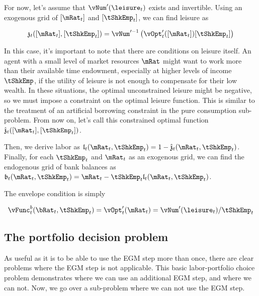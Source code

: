 \documentclass[\econtexRoot/EGMN]{subfiles}
\begin{document}
For now, let's assume that $\vNum'(\leisure_{t})$ exists and invertible. Using
an exogenous grid of $[\mRat_{t}]$ and $[\tShkEmp_{t}]$, we can find leisure as

\providecommand{\zEndFunc}{\ensuremath{\mathfrak{z}}}

\begin{equation}
    \zEndFunc_{t}([\mRat_{t}], [\tShkEmp_{t}]) = \vNum'^{-1}\left(
    \vOpt_{t}'([\mRat_{t}]) [\tShkEmp_{t}] \right)
\end{equation}

In this case, it's important to note that there are conditions on leisure itself. An agent with a small level of market resources $\mRat$ might want to work more than their available time endowment, especially at higher levels of income $\tShkEmp$, if the utility of leisure is not enough to compensate for their low wealth. In these situations, the optimal unconstrained leisure might be negative, so we must impose a constraint on the optimal leisure function. This is similar to the treatment of an artificial borrowing constraint in the pure consumption sub-problem. From now on, let's call this constrained optimal function $\hat{\zEndFunc}_{t}([\mRat_{t}], [\tShkEmp_{t}])$.

\providecommand{\lEndFunc}{\ensuremath{\mathfrak{l}}}
\providecommand{\bEndFunc}{\ensuremath{\mathfrak{b}}}

Then, we derive labor as $\lEndFunc_{t}(\mRat_{t}, \tShkEmp_{t}) = 1 -
    \hat{\zEndFunc}_{t}(\mRat_{t}, \tShkEmp_{t})$. Finally, for each
$\tShkEmp_{t}$ and
$\mRat_{t}$ as an exogenous grid, we can find the endogenous grid of bank
balances as $\bEndFunc_{t}(\mRat_{t}, \tShkEmp_{t}) = \mRat_{t} -
    \tShkEmp_{t}\lEndFunc_{t}(\mRat_{t}, \tShkEmp_{t})$.

The envelope condition is simply

\begin{equation}
    \vFunc_{t}^{b}(\bRat_{t}, \tShkEmp_{t}) = \vOpt_{t}'(\mRat_{t}) =
    \vNum'(\leisure_{t})/\tShkEmp_{t}
\end{equation}

\subsection{The portfolio decision problem}

As useful as it is to be able to use the EGM step more than once, there are clear problems where the EGM step is not applicable. This basic labor-portfolio choice problem demonstrates where we can use an additional EGM step, and where we can not. Now, we go over a sub-problem where we can not use the EGM step.
\end{document}
